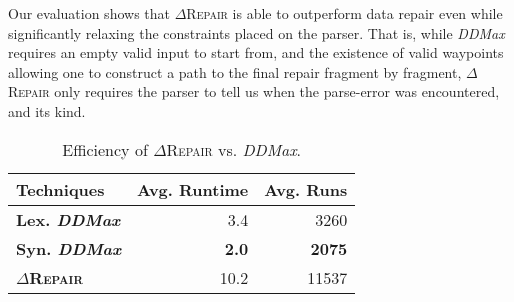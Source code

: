 \documentclass[acmsmall,screen,review,anonymous]{acmart}
\newcounter{todocounter}
\newcommand{\todo}[1]{\marginpar{$|$}\textcolor{red}{\stepcounter{todocounter}\footnote[\thetodocounter]{\textcolor{red}{\textbf{TODO }}\textit{#1}}}}
\renewcommand{\todo}[1]{}
\newcommand{\dtask}{data repair\xspace}
\newcommand{\approach}{\textsc{$\Delta$Repair}\xspace}
\newcommand{\ddmax}{\textit{DDMax}\xspace}
\newcommand{\drepair}{\approach}
\begin{document}

Our evaluation shows that \drepair is able to outperform 
\dtask even while significantly relaxing the constraints placed on the parser.
That is, while \ddmax requires an empty valid input to start from, and the
existence of valid waypoints allowing one to construct a path to the final
repair fragment by fragment, \drepair only requires the parser to tell us when
the parse-error was encountered, and its kind.


\begin{table}[!bp]\centering
\caption{Efficiency of \approach vs. \ddmax. 
}
\begin{tabular}{|l | r | r |}
\hline
\textbf{Techniques} %
&  \textbf{Avg. Runtime}  & \textbf{Avg. Runs}  \\
\hline
\textbf{Lex. \ddmax} & 3.4 & 3260 \\
\textbf{Syn. \ddmax} & \textbf{2.0} & \textbf{2075}  \\
\textbf{\approach} &  10.2 & 11537 \\
\hline
\end{tabular}
\label{tab:efficiency}
\end{table}
\end{document}
